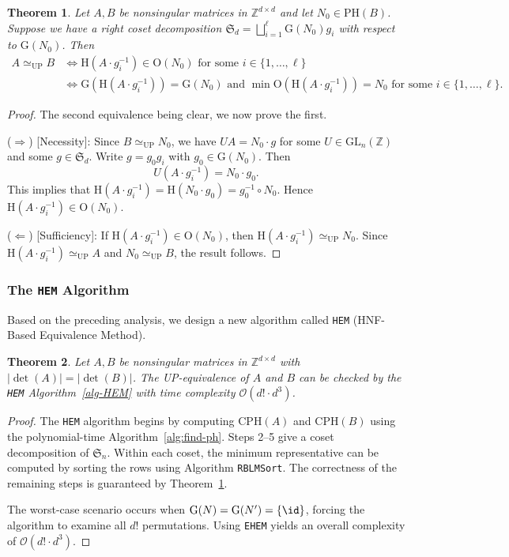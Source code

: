 \documentclass[reqno, 12pt]{article}
\newtheorem{thm}{Theorem}[section]
\theoremstyle{mydefinition}
\theoremstyle{myremark}
\numberwithin{algorithm}{section}
\def\Z{\mathbb{Z}}
\newcommand{\h}{{\mathrm{H}}}
\newcommand{\ph}{{\mathrm{PH}}}
\begin{document}
\begin{thm}\label{thm-O-deter}
Let $A,B$ be nonsingular matrices in $\Z^{d\times d}$ and let $N_0\in\ph(B)$. Suppose we have a right coset decomposition $\mathfrak{S}_d = \bigsqcup_{i=1}^{\ell} \mathrm G(N_0)g_i$ with respect to $\mathrm G(N_0)$. Then
\begin{align*}
  A \simeq_{\mathrm{UP}} B  & \iff \h(A\cdot g_i^{-1})\in \mathrm O(N_0) \text{ for some } i \in \{1,\ldots,\ell\} \\
  & \iff \mathrm{G}( \h(A\cdot g_i^{-1})) =\mathrm{G}(N_0)  \text { and }  \min\mathrm{O}( \h(A\cdot g_i^{-1}))=N_0   \text{ for some } i \in \{1,\ldots,\ell\}.
\end{align*}
\end{thm}

\begin{proof}
The second equivalence being clear, we now prove the first.

($\Rightarrow$) [Necessity]: Since $B \simeq_{\mathrm{UP}} N_0$, we have $UA=N_0\cdot g$ for some $U\in \mathrm{GL}_n(\mathbb{Z})$ and some $g \in \mathfrak{S}_d$. Write $g = g_0 g_i$ with $g_0 \in \mathrm G(N_0)$. Then
\[
U(A\cdot g_i^{-1})=N_0\cdot g_0.
\]
This implies that $\h(A\cdot g_i^{-1})= \h(N_0\cdot g_0)= g_0^{-1} \circ N_0$. Hence $\h(A\cdot g_i^{-1})\in \mathrm O(N_0)$.

($\Leftarrow$) [Sufficiency]: If $\h(A\cdot g_i^{-1})\in \mathrm O(N_0)$, then $ \h(A\cdot g_i^{-1})  \simeq_{{\mathrm {UP}}} N_0 $. Since $ \h(A\cdot g_i^{-1})  \simeq_{{\mathrm {UP}}} A $ and $N_0 \simeq_{{\mathrm {UP}}} B $, the result follows.
\end{proof}

\subsubsection{The \texttt{HEM} Algorithm}

Based on the preceding analysis, we design a new algorithm called \texttt{HEM} (HNF-Based Equivalence Method).

\begin{thm}
Let $A,B$ be nonsingular matrices in $\Z^{d\times d}$ with $|\det(A)|=|\det(B)|$.
The UP-equivalence of $A$ and $B$ can be checked by the \emph{\texttt{HEM}} Algorithm~\ref{alg-HEM} with time complexity $\mathcal O(d!\cdot d^3 )$.
\end{thm}
\begin{proof}
The \texttt{HEM} algorithm begins by computing $\mathrm{CPH}(A)$ and $\mathrm{CPH}(B)$ using the polynomial-time Algorithm~\ref{alg:find-ph}. Steps 2--5 give a coset decomposition of $\mathfrak S_n$. Within each coset, the minimum representative can be computed by sorting the rows using Algorithm \texttt{RBLMSort}.  The correctness of the remaining steps is guaranteed by Theorem~\ref{thm-O-deter}.

The worst-case scenario occurs when $\mathrm{G}(N)=\mathrm{G}(N^\prime)=\{\id\}$, forcing the algorithm to examine all $d!$ permutations. Using \texttt{EHEM} yields an overall complexity of $\mathcal O(d!\cdot d^3)$.
\end{proof}
\end{document}
